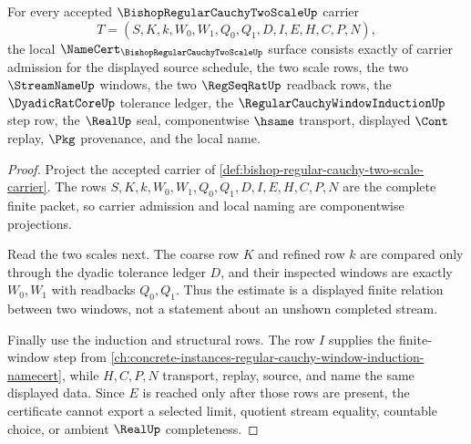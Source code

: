 \begin{theorem}
\label{thm:bishop-regular-cauchy-two-scale-obligations}
For every accepted $\BishopRegularCauchyTwoScaleUp$ carrier
$$
T=(S,K,k,W_0,W_1,Q_0,Q_1,D,I,E,H,C,P,N),
$$
the local $\NameCert_{\BishopRegularCauchyTwoScaleUp}$ surface consists exactly of carrier admission for the displayed source schedule, the two scale rows, the two $\StreamNameUp$ windows, the two $\RegSeqRatUp$ readback rows, the $\DyadicRatCoreUp$ tolerance ledger, the $\RegularCauchyWindowInductionUp$ step row, the $\RealUp$ seal, componentwise $\hsame$ transport, displayed $\Cont$ replay, $\Pkg$ provenance, and the local name.
\end{theorem}
\begin{proof}
Project the accepted carrier of \autoref{def:bishop-regular-cauchy-two-scale-carrier}. The rows $S,K,k,W_0,W_1,Q_0,Q_1,D,I,E,H,C,P,N$ are the complete finite packet, so carrier admission and local naming are componentwise projections.

Read the two scales next. The coarse row $K$ and refined row $k$ are compared only through the dyadic tolerance ledger $D$, and their inspected windows are exactly $W_0,W_1$ with readbacks $Q_0,Q_1$. Thus the estimate is a displayed finite relation between two windows, not a statement about an unshown completed stream.

Finally use the induction and structural rows. The row $I$ supplies the finite-window step from \autoref{ch:concrete-instances-regular-cauchy-window-induction-namecert}, while $H,C,P,N$ transport, replay, source, and name the same displayed data. Since $E$ is reached only after those rows are present, the certificate cannot export a selected limit, quotient stream equality, countable choice, or ambient $\RealUp$ completeness.
\end{proof}




